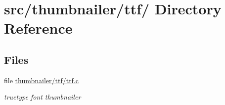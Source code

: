 \hypertarget{dir_000048}{
\section{src/thumbnailer/ttf/ Directory Reference}
\label{dir_000048}
}
\subsection*{Files}
\begin{CompactItemize}
\item 
file \hyperlink{thumbnailer_2ttf_2ttf_8c}{thumbnailer/ttf/ttf.c}
\begin{CompactList}\small\item\em truetype font thumbnailer \item\end{CompactList}

\end{CompactItemize}
